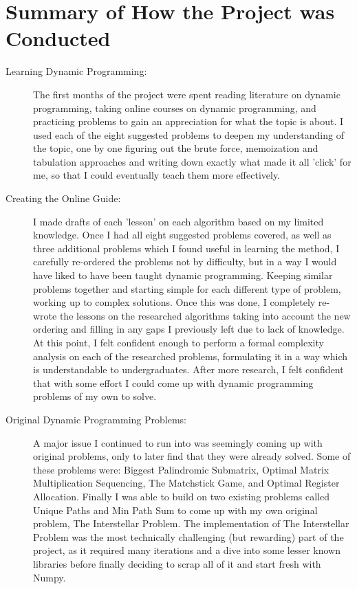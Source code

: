 \section{Summary of How the Project was Conducted}
\begin{description}
    \item[Learning Dynamic Programming:]
    The first months of the project were spent reading literature on dynamic programming, taking online courses on dynamic programming, and practicing problems to gain an appreciation for what the topic is about.
    I used each of the eight suggested problems to deepen my understanding of the topic, one by one figuring out the brute force,
    memoization and tabulation approaches and writing down exactly what made it all 'click' for me,
    so that I could eventually teach them more effectively.

    \item[Creating the Online Guide:]
I made drafts of each 'lesson' on each algorithm based on my limited knowledge.
Once I had all eight suggested problems covered, as well as three additional problems which I found useful in learning the method,
I carefully re-ordered the problems not by difficulty, but in a way I would have liked to have been taught dynamic programming. Keeping similar problems together and starting simple for each different type of problem, working up to complex solutions.
Once this was done, I completely re-wrote the lessons on the researched algorithms taking into account the new ordering and filling in any gaps I previously left due to lack of knowledge.
At this point, I felt confident enough to perform a formal complexity analysis on each of the researched problems, formulating it in a way which is understandable to undergraduates.
After more research, I felt confident that with some effort I could come up with dynamic programming problems of my own to solve.

    \item[Original Dynamic Programming Problems:]
A major issue I continued to run into was seemingly coming up with original problems, only to later find that they were already solved.
Some of these problems were: Biggest Palindromic Submatrix, Optimal Matrix Multiplication Sequencing, The Matchstick Game, and Optimal Register Allocation.
Finally I was able to build on two existing problems called Unique Paths and Min Path Sum to come up with my own original problem, The Interstellar Problem.
The implementation of The Interstellar Problem was the most technically challenging (but rewarding) part of the project, as it required many iterations and a dive into some lesser known libraries before finally deciding to scrap all of it and start fresh with Numpy.


\end{description}
